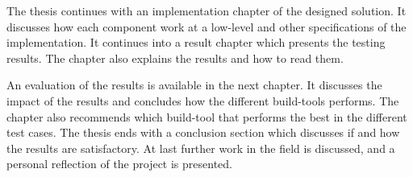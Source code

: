 The thesis continues with an implementation chapter of the designed solution. It discusses how each component work at a low-level and other specifications of the implementation. It continues into a result chapter which presents the testing results. The chapter also explains the results and how to read them. 

An evaluation of the results is available in the next chapter. It discusses the impact of the results and concludes how the different build-tools performs. The chapter also recommends which build-tool that performs the best in the different test cases. The thesis ends with a conclusion section which discusses if and how the results are satisfactory. At last further work in the field is discussed, and a personal reflection of the project is presented. 




